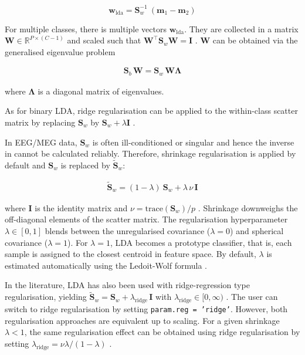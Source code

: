\documentclass[utf8]{frontiersSCNS} %
\newcommand{\m}{\mathbf{m}}
\newcommand{\w}{\mathbf{w}}
\newcommand{\I}{\mathbf{I}}
\newcommand{\R}{\mathbb{R}}
\renewcommand{\S}{\mathbf{S}}
\newcommand{\W}{\mathbf{W}}
\newcommand{\ttt}[1]{\texttt{#1}}
\begin{document}
\begin{equation}
\label{eq:lda_solution}
\w_{\text{lda}} = \S_w^{-1}\ (\m_1 - \m_2)
\end{equation}

For multiple classes, there is multiple vectors $\w_{\text{lda}}$. They are collected in a matrix $\W\in\R^{P\times(C-1)}$ and scaled such that $\W^\top\S_w\W = \I$ \citep{Bishop2007}. $\W$ can be obtained via the generalised eigenvalue problem

\begin{align}
\label{eq:LDA-eigenvalue-multiclass}
\S_b\,\W = \S_w\,\W\mathbf{\Lambda}
\end{align}

where $\mathbf{\Lambda}$ is a diagonal matrix of eigenvalues.

As for binary LDA, ridge regularisation can be applied to the within-class scatter matrix by replacing $\S_w$ by $\S_w+\lambda\I$ \citep{Friedman1989}.

In EEG/MEG data, $\S_w$ is often ill-conditioned or singular and hence the inverse in  cannot be calculated reliably. Therefore, shrinkage regularisation is applied by default and $\S_w$ is replaced by $\widetilde{\S}_w$:

\begin{align}
\label{eq:shrinkage}
\widetilde{\S}_w = (1-\lambda)\ \S_w + \lambda\,\nu\,\I
\end{align}

where $\I$ is the identity matrix and $\nu = \text{trace}(\S_w)/p$ \citep{Blankertz2011}. Shrinkage downweighs the off-diagonal elements of the scatter matrix. The regularisation hyperparameter $\lambda\in [0,1]$ blends between the unregularised covariance ($\lambda=0$) and spherical covariance ($\lambda=1$). For $\lambda=1$, LDA becomes a prototype classifier, that is, each sample is assigned to the closest centroid in feature space. By default, $\lambda$ is estimated automatically using the Ledoit-Wolf formula \citep{Ledoit2003HoneyMatrix,Blankertz2011}.

In the literature, LDA has also been used with ridge-regression type regularisation, yielding $\widetilde{\S}_w = \S_w + \lambda_\text{ridge}\,\I$ with $\lambda_\text{ridge}\in [0,\infty)$ \citep{Friedman1989RegularizedAnalysis}. The user can switch to ridge regularisation by setting \ttt{param.reg = 'ridge'}. However, both regularisation approaches are equivalent up to scaling. For a given shrinkage $\lambda<1$, the same regularisation effect can be obtained using ridge regularisation by setting $\lambda_\text{ridge} = \nu\lambda / (1-\lambda)$
\citep{Treder2018Cross-validationLDA}.
\end{document}

